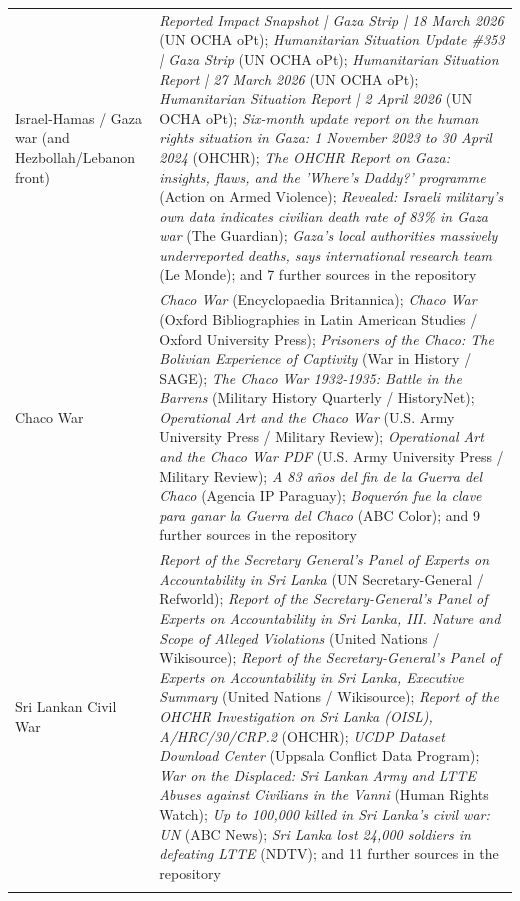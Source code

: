 \documentclass[11pt]{article}
\begin{document}
\begin{scriptsize}
\begin{longtable}{p{3.5cm} p{12.5cm}}
\addlinespace
Israel-Hamas / Gaza war (and Hezbollah/Lebanon front) & \emph{Reported Impact Snapshot | Gaza Strip | 18 March 2026} (UN OCHA oPt); \emph{Humanitarian Situation Update \#353 | Gaza Strip} (UN OCHA oPt); \emph{Humanitarian Situation Report | 27 March 2026} (UN OCHA oPt); \emph{Humanitarian Situation Report | 2 April 2026} (UN OCHA oPt); \emph{Six-month update report on the human rights situation in Gaza: 1 November 2023 to 30 April 2024} (OHCHR); \emph{The OHCHR Report on Gaza: insights, flaws, and the 'Where's Daddy?' programme} (Action on Armed Violence); \emph{Revealed: Israeli military's own data indicates civilian death rate of 83\% in Gaza war} (The Guardian); \emph{Gaza's local authorities massively underreported deaths, says international research team} (Le Monde); and 7 further sources in the repository \\
\addlinespace
Chaco War & \emph{Chaco War} (Encyclopaedia Britannica); \emph{Chaco War} (Oxford Bibliographies in Latin American Studies / Oxford University Press); \emph{Prisoners of the Chaco: The Bolivian Experience of Captivity} (War in History / SAGE); \emph{The Chaco War 1932-1935: Battle in the Barrens} (Military History Quarterly / HistoryNet); \emph{Operational Art and the Chaco War} (U.S. Army University Press / Military Review); \emph{Operational Art and the Chaco War PDF} (U.S. Army University Press / Military Review); \emph{A 83 años del fin de la Guerra del Chaco} (Agencia IP Paraguay); \emph{Boquerón fue la clave para ganar la Guerra del Chaco} (ABC Color); and 9 further sources in the repository \\
\addlinespace
Sri Lankan Civil War & \emph{Report of the Secretary General's Panel of Experts on Accountability in Sri Lanka} (UN Secretary-General / Refworld); \emph{Report of the Secretary-General's Panel of Experts on Accountability in Sri Lanka, III. Nature and Scope of Alleged Violations} (United Nations / Wikisource); \emph{Report of the Secretary-General's Panel of Experts on Accountability in Sri Lanka, Executive Summary} (United Nations / Wikisource); \emph{Report of the OHCHR Investigation on Sri Lanka (OISL), A/HRC/30/CRP.2} (OHCHR); \emph{UCDP Dataset Download Center} (Uppsala Conflict Data Program); \emph{War on the Displaced: Sri Lankan Army and LTTE Abuses against Civilians in the Vanni} (Human Rights Watch); \emph{Up to 100,000 killed in Sri Lanka's civil war: UN} (ABC News); \emph{Sri Lanka lost 24,000 soldiers in defeating LTTE} (NDTV); and 11 further sources in the repository \\
\addlinespace

\end{longtable}
\end{scriptsize}
\end{document}
